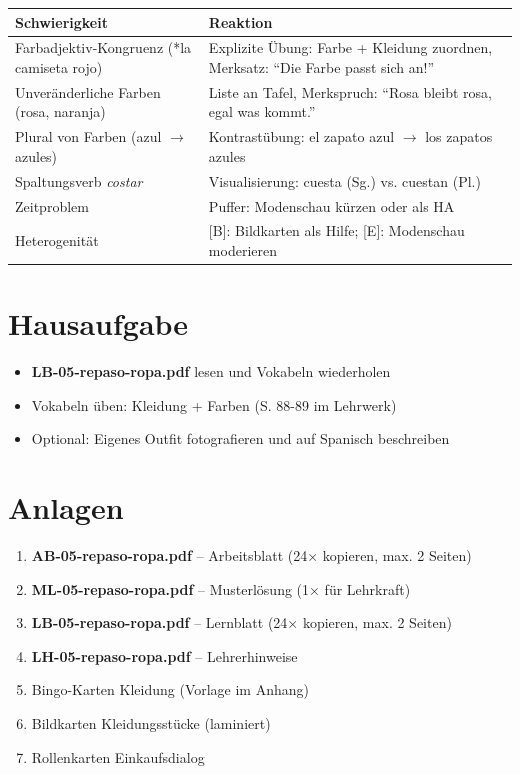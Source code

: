 \documentclass[11pt,a4paper]{article}
\begin{document}
\begin{tabular}{|p{5cm}|p{8cm}|}
\hline
\textbf{Schwierigkeit} & \textbf{Reaktion} \\
\hline
Farbadjektiv-Kongruenz (*la camiseta rojo) & Explizite Übung: Farbe + Kleidung zuordnen, Merksatz: ``Die Farbe passt sich an!'' \\
\hline
Unveränderliche Farben (rosa, naranja) & Liste an Tafel, Merkspruch: ``Rosa bleibt rosa, egal was kommt.'' \\
\hline
Plural von Farben (azul $\rightarrow$ azules) & Kontrastübung: el zapato azul $\rightarrow$ los zapatos azules \\
\hline
Spaltungsverb \textit{costar} & Visualisierung: cuesta (Sg.) vs. cuestan (Pl.) \\
\hline
Zeitproblem & Puffer: Modenschau kürzen oder als HA \\
\hline
Heterogenität & [B]: Bildkarten als Hilfe; [E]: Modenschau moderieren \\
\hline
\end{tabular}

\section{Hausaufgabe}

\begin{itemize}
    \item \textbf{LB-05-repaso-ropa.pdf} lesen und Vokabeln wiederholen
    \item Vokabeln üben: Kleidung + Farben (S. 88-89 im Lehrwerk)
    \item Optional: Eigenes Outfit fotografieren und auf Spanisch beschreiben
\end{itemize}

\section{Anlagen}

\begin{enumerate}
    \item \textbf{AB-05-repaso-ropa.pdf} -- Arbeitsblatt (24× kopieren, max. 2 Seiten)
    \item \textbf{ML-05-repaso-ropa.pdf} -- Musterlösung (1× für Lehrkraft)
    \item \textbf{LB-05-repaso-ropa.pdf} -- Lernblatt (24× kopieren, max. 2 Seiten)
    \item \textbf{LH-05-repaso-ropa.pdf} -- Lehrerhinweise
    \item Bingo-Karten Kleidung (Vorlage im Anhang)
    \item Bildkarten Kleidungsstücke (laminiert)
    \item Rollenkarten Einkaufsdialog
\end{enumerate}
\end{document}
